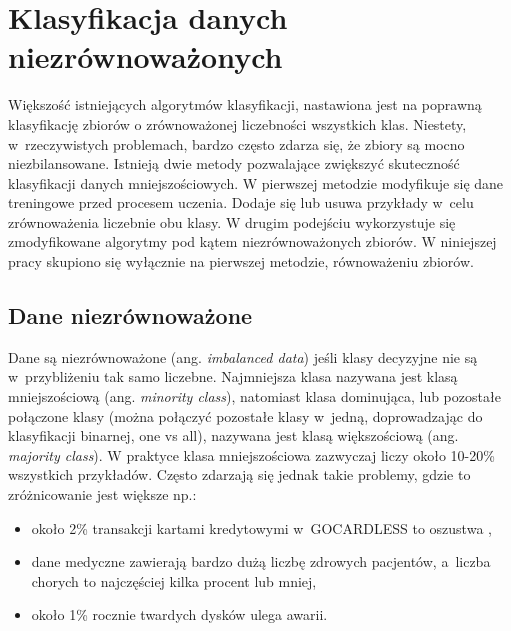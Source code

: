 \chapter{Klasyfikacja danych niezrównoważonych}
Większość istniejących algorytmów klasyfikacji, nastawiona jest na poprawną klasyfikację zbiorów o zrównoważonej liczebności wszystkich klas. Niestety, w~rzeczywistych problemach, bardzo często zdarza się, że zbiory są mocno niezbilansowane. Istnieją dwie metody pozwalające zwiększyć skuteczność klasyfikacji danych mniejszościowych. W pierwszej metodzie modyfikuje się dane treningowe przed procesem uczenia. Dodaje się lub usuwa przykłady w~celu zrównoważenia liczebnie obu klasy. W drugim podejściu wykorzystuje się zmodyfikowane algorytmy pod kątem niezrównoważonych zbiorów. W niniejszej pracy skupiono się wyłącznie na pierwszej metodzie, równoważeniu zbiorów.	
\section{Dane niezrównoważone}
Dane są niezrównoważone (ang. \textit{imbalanced data}) jeśli klasy decyzyjne nie są w~przybliżeniu tak samo liczebne. Najmniejsza klasa nazywana jest klasą mniejszościową (ang. \textit{minority class}), natomiast klasa dominująca, lub pozostałe połączone klasy (można połączyć pozostałe klasy w~jedną, doprowadzając do klasyfikacji binarnej, one vs all), nazywana jest klasą większościową (ang. \textit{majority class}). W praktyce klasa mniejszościowa zazwyczaj liczy około 10-20\% wszystkich przykładów. Często zdarzają się jednak takie problemy, gdzie to zróżnicowanie jest większe np.:
\begin{itemize}
	\item około 2\% transakcji kartami kredytowymi w~GOCARDLESS to oszustwa \cite{gocardless},
	\item dane medyczne zawierają bardzo dużą liczbę zdrowych pacjentów, a~liczba chorych to najczęściej kilka procent lub mniej,
	\item około 1\% rocznie twardych dysków ulega awarii.
	
\end{itemize}

